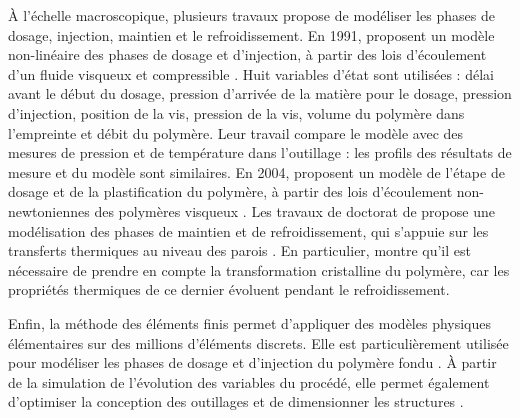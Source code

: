 À l'échelle macroscopique, plusieurs travaux propose de modéliser les phases de dosage, injection, maintien et le refroidissement.
En 1991, \citeauthor{chiu_dynamic_1991} proposent un modèle non-linéaire des phases de dosage et d'injection, à partir des lois d'écoulement d'un fluide visqueux et compressible \cite{chiu_dynamic_1991}.
Huit variables d’état sont utilisées : délai avant le début du dosage, pression d’arrivée de la matière pour le dosage, pression d’injection, position de la vis, pression de la vis, volume du polymère dans l’empreinte et débit du polymère.
Leur travail compare le modèle avec des mesures de pression et de température dans l'outillage : les profils des résultats de mesure et du modèle sont similaires.
En 2004, \citeauthor{bereaux_series_2004} proposent un modèle de l'étape de dosage et de la plastification du polymère, à partir des lois d'écoulement non-newtoniennes des polymères visqueux \cite{bereaux_series_2004}.  %
Les travaux de doctorat de \citeauthor{legoff_etude_2006} propose une modélisation des phases de maintien et de refroidissement, qui s'appuie sur les transferts thermiques au niveau des parois \cite{legoff_study_2005, legoff_etude_2006}.
En particulier, \citeauthor{legoff_etude_2006} montre qu'il est nécessaire de prendre en compte la transformation cristalline du polymère, car les propriétés thermiques de ce dernier évoluent pendant le refroidissement.

Enfin, la méthode des éléments finis permet d'appliquer des modèles physiques élémentaires sur des millions d'éléments discrets.
Elle est particulièrement utilisée pour modéliser les phases de dosage et d'injection du polymère fondu \cite{moguedet_use_2009}.
À partir de la simulation de l'évolution des variables du procédé, elle permet également d’optimiser la conception des outillages et de dimensionner les structures \cite{gao_adaptive_2008}.

